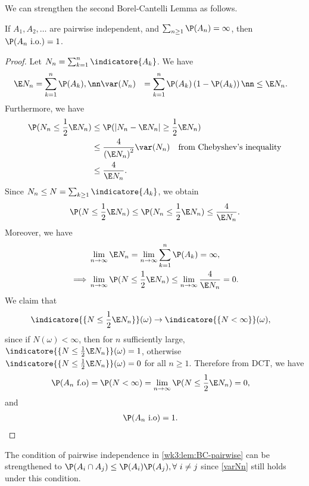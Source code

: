 \documentclass[../aipt.tex]{subfiles}
\begin{document}
We can strengthen the second Borel-Cantelli Lemma as follows.
\begin{Lemma}\label{wk3:lem:BC-pairwise}
If $A_1, A_2, \ldots$ are pairwise independent, and $\sum_{n \geq 1} \P(A_n) = \infty$, then $\P(A_n \io) = 1$.
\end{Lemma}
\begin{proof}
Let $N_n = \sum_{k=1}^{n} \indicatore{A_k}$. We have
\begin{align}
\E N_n 
&= \sum_{k=1}^n \P(A_k), \nn
\var(N_n) 
&= \sum_{k=1}^n\P(A_k)\left(1-\P(A_k)\right) \nn
&\leq \E N_n.\label{varNn}
\end{align}
Furthermore, we have
\begin{align*}
\P(N_n \leq \frac{1}{2}\E N_n) 
&\leq \P(|N_n - \E N_n| \geq \frac{1}{2} \E N_n) \\
&\leq \frac{4}{\left(\E N_n\right)^2} \var(N_n) \quad \text{from Chebyshev's inequality} \\
&\leq \frac{4}{\E N_n}.
\end{align*}
Since $N_n \leq N =\sum_{k\geq1} \indicatore{A_k}$, we obtain
\begin{align*}
\P(N \leq \frac{1}{2}\E N_n) 
\leq \P(N_n \leq \frac{1}{2}\E N_n)
\leq \frac{4}{\E N_n}.
\end{align*}
Moreover, we have
\begin{align*}
&\lim_{n \to \infty} \E N_n = \lim_{n \to \infty} \sum_{k=1}^n \P(A_k) = \infty, \\
\implies
&\lim_{n \to \infty} \P(N \leq \frac{1}{2}\E N_n) \leq \lim_{n \to \infty} \frac{4}{\E N_n} = 0.
\end{align*}
We claim that
\begin{align*}
&\indicatore{\{N \leq \frac{1}{2} \E N_n\}}(\omega) \to \indicatore{\{N <\infty\}}(\omega),
\end{align*}
since if $N(\omega)<\infty$, then for $n$ sufficiently large, $\indicatore{\{N \leq \frac{1}{2} \E N_n\}}(\omega)=1$, otherwise $\indicatore{\{N \leq \frac{1}{2} \E N_n\}}(\omega)=0$ for all $n\geq 1$. Therefore from DCT, we have
\begin{align*}
&\P(A_n \ \text{f.o}) = \P(N < \infty) = \lim_{n \to \infty} \P(N \leq \frac{1}{2} \E N_n) = 0, 
\end{align*}
and
\begin{align*}
&\P(A_n \ \text{i.o}) = 1.
\end{align*}
\end{proof}
%
\begin{Remark}
The condition of pairwise independence in \cref{wk3:lem:BC-pairwise} can be strengthened to $\P(A_i \cap A_j) \leq \P(A_i)\P(A_j), \forall\ i \neq j$ since \cref{varNn} still holds under this condition.
\end{Remark}
\end{document}
